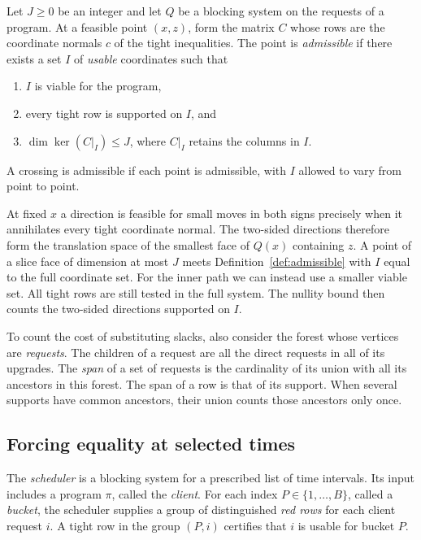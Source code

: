 \begin{definition}[Admissibility]\label{def:admissible}
Let \(J\ge0\) be an integer and let \(Q\) be a blocking system on the
requests of a program. At a feasible point \((x,z)\), form the matrix
\(C\) whose rows are the coordinate normals \(c\) of the tight
inequalities. The point is \emph{admissible} if there exists a
set \(I\) of \emph{usable} coordinates such that
\begin{enumerate}
\item \(I\) is viable for the program,
\item every tight row is supported on \(I\), and
\item \(\dim\ker(C|_I)\le J\), where \(C|_I\) retains the columns in \(I\).
\end{enumerate}
A crossing is admissible if each point is admissible, with \(I\)
allowed to vary from point to point.
\end{definition}

At fixed \(x\) a direction is feasible for small moves in both signs
precisely when it annihilates every tight coordinate normal. The
two-sided directions therefore form the translation space of the
smallest face of \(Q(x)\) containing \(z\). A point of a slice face of
dimension at most \(J\) meets Definition~\ref{def:admissible} with \(I\)
equal to the full coordinate set. For the inner path we can instead use
a smaller viable set. All tight rows are still tested in the full system.
The nullity bound then counts the two-sided directions supported on \(I\).

To count the cost of substituting slacks, also consider the forest whose
vertices are \emph{requests}. The children of a request are all the
direct requests in all of its upgrades. The \emph{span} of a set of
requests is the cardinality of its union with all its ancestors in this
forest. The span of a row is that of its support. When several supports
have common ancestors, their union counts those ancestors only once.

\subsection{Forcing equality at selected times}

The \emph{scheduler} is a blocking system for a prescribed list of
time intervals. Its input includes a program \(\pi\), called the
\emph{client}. For each index \(P\in\{1,\ldots,B\}\), called a
\emph{bucket}, the scheduler supplies a group of distinguished
\emph{red rows} for each client request \(i\). A tight row in the group
\((P,i)\) certifies that \(i\) is usable for bucket \(P\).

